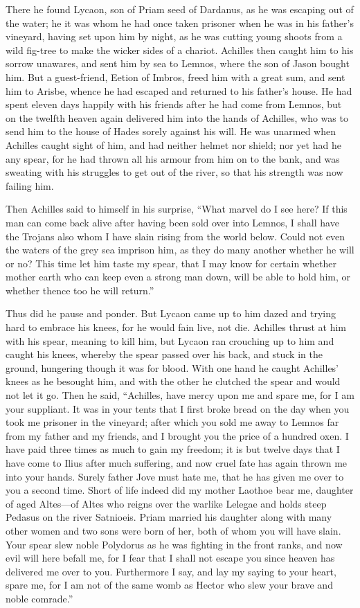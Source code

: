 There he found Lycaon, son of Priam seed of Dardanus, as he was escaping
out of the water; he it was whom he had once taken prisoner when he was in
his father’s vineyard, having set upon him by night, as he was cutting
young shoots from a wild fig-tree to make the wicker sides of a chariot.
Achilles then caught him to his sorrow unawares, and sent him by sea to
Lemnos, where the son of Jason bought him. But a guest-friend, Eetion of
Imbros, freed him with a great sum, and sent him to Arisbe, whence he had
escaped and returned to his father’s house. He had spent eleven days
happily with his friends after he had come from Lemnos, but on the twelfth
heaven again delivered him into the hands of Achilles, who was to send him
to the house of Hades sorely against his will. He was unarmed when
Achilles caught sight of him, and had neither helmet nor shield; nor yet
had he any spear, for he had thrown all his armour from him on to the
bank, and was sweating with his struggles to get out of the river, so that
his strength was now failing him.

Then Achilles said to himself in his surprise, “What marvel do I see here?
If this man can come back alive after having been sold over into Lemnos, I
shall have the Trojans also whom I have slain rising from the world below.
Could not even the waters of the grey sea imprison him, as they do many
another whether he will or no? This time let him taste my spear, that I
may know for certain whether mother earth who can keep even a strong man
down, will be able to hold him, or whether thence too he will return.”

Thus did he pause and ponder. But Lycaon came up to him dazed and trying
hard to embrace his knees, for he would fain live, not die. Achilles
thrust at him with his spear, meaning to kill him, but Lycaon ran
crouching up to him and caught his knees, whereby the spear passed over
his back, and stuck in the ground, hungering though it was for blood. With
one hand he caught Achilles’ knees as he besought him, and with the other
he clutched the spear and would not let it go. Then he said, “Achilles,
have mercy upon me and spare me, for I am your suppliant. It was in your
tents that I first broke bread on the day when you took me prisoner in the
vineyard; after which you sold me away to Lemnos far from my father and my
friends, and I brought you the price of a hundred oxen. I have paid three
times as much to gain my freedom; it is but twelve days that I have come
to Ilius after much suffering, and now cruel fate has again thrown me into
your hands. Surely father Jove must hate me, that he has given me over to
you a second time. Short of life indeed did my mother Laothoe bear me,
daughter of aged Altes—of Altes who reigns over the warlike Lelegae
and holds steep Pedasus on the river Satnioeis. Priam married his daughter
along with many other women and two sons were born of her, both of whom
you will have slain. Your spear slew noble Polydorus as he was fighting in
the front ranks, and now evil will here befall me, for I fear that I shall
not escape you since heaven has delivered me over to you. Furthermore I
say, and lay my saying to your heart, spare me, for I am not of the same
womb as Hector who slew your brave and noble comrade.”

